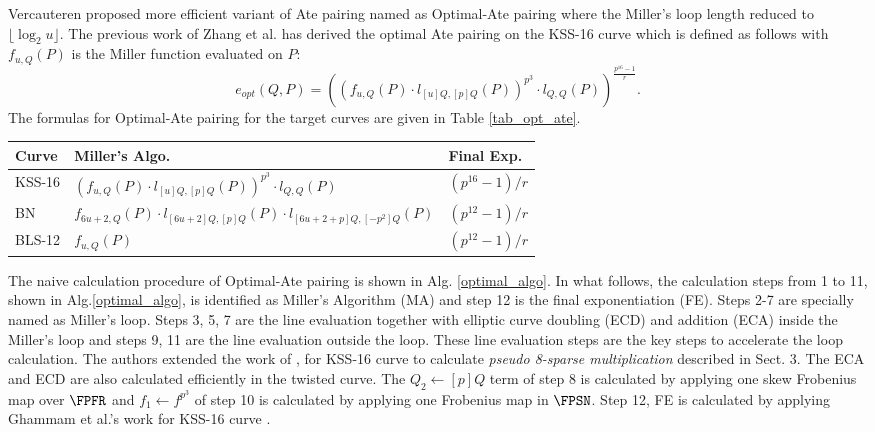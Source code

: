 Vercauteren proposed more efficient variant of Ate pairing named as Optimal-Ate pairing \cite{DBLP:journals/tit/Vercauteren10} where the Miller's loop length reduced to $\lfloor \log_2 u \rfloor$.
The previous work of Zhang et al. \cite{INDOCRYPT:ZhaLin12} has derived the optimal Ate pairing on the KSS-16 curve which is defined as follows with $f_{u,Q}(P)$ is the Miller function evaluated on $P$:
\begin{equation}
	e_{opt}(Q,P)=((f_{u,Q}(P)\cdot l_{[u]Q,[p]Q}(P))^{p^3}\cdot l_{Q,Q}(P))^{\frac{p^{16}-1}{r}}\label{pairing}.
\end{equation}
The formulas for Optimal-Ate pairing for the target curves are given in Table \ref{tab_opt_ate}. 
\renewcommand{\baselinestretch}{1.5}
\begin{table*}[t]
\centering
\caption{Optimal-Ate pairing formulas for target curves}
\label{tab_opt_ate}
\begin{tabular}{|l|l|l|}
\hline
Curve  & Miller's Algo.                                                             & Final Exp.             \\ \hline
KSS-16 & $(f_{u,Q}(P)\cdot l_{[u]Q,[p]Q}(P))^{p^3}\cdot l_{Q,Q}(P)$                        & $(p^{16}-1)/r$ \\ \hline
BN     & $f_{6u+2,Q}(P )\cdot l_{[6u+2]Q,[p]Q} (P ) \cdot l_{[6u+2+p]Q,[-p^2]Q} (P)$ & $(p^{12}-1)/r$         \\ \hline
BLS-12 & $f_{u,Q}(P )$                                                              & $(p^{12}-1)/r$       \\ \hline
\end{tabular}
\end{table*}
\renewcommand{\baselinestretch}{1.0}

The naive calculation procedure of Optimal-Ate pairing is shown in Alg. \ref{optimal_algo}.
In what follows, the calculation steps from 1 to 11, shown in Alg.\ref{optimal_algo}, is identified as Miller's Algorithm (MA) and step 12 is the final exponentiation (FE).
Steps 2-7 are specially named as Miller's loop.
Steps 3, 5, 7 are the line evaluation together with elliptic curve doubling (ECD) and addition (ECA) inside the Miller's loop and steps 9, 11 are the line evaluation outside the loop.
These line evaluation steps are the key steps to accelerate the loop calculation. 
The authors extended the work of \cite{PAIRING:MANS13},\cite{ICISC:KONSD16} for KSS-16 curve to calculate \textit{pseudo 8-sparse multiplication} described in Sect. 3. The ECA and ECD are also calculated efficiently in the twisted curve. 
The $Q_2 \leftarrow [p]Q$ term of step 8 is calculated by applying one skew Frobenius map over $\FPFR$ and $f_1\leftarrow f^{p^3}$ of step 10 is calculated by applying one Frobenius map in $\FPSN$. 
Step 12, FE is calculated by applying Ghammam et al.'s work for KSS-16 curve \cite{EPRINT:GhaFou16b}.

